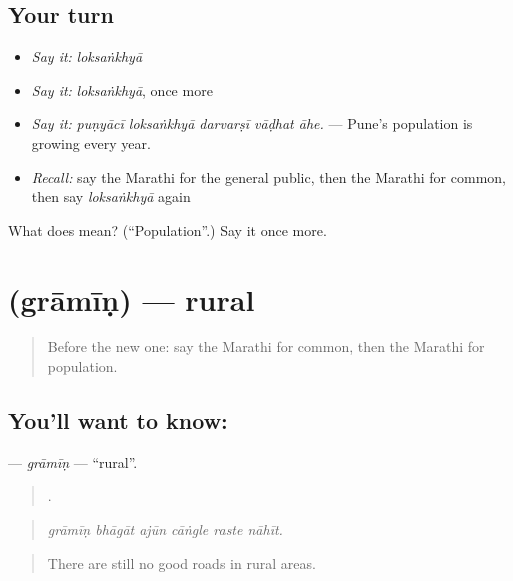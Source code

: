 \subsection*{Your turn}
\begin{itemize}
\raggedright
  \item \emph{Say it:} \emph{loksaṅkhyā}
  \item \emph{Say it:} \emph{loksaṅkhyā}, once more
  \item \emph{Say it:} \emph{puṇyācī loksaṅkhyā darvarṣī vāḍhat āhe.} — Pune's population is growing every year.
  \item \emph{Recall:} say the Marathi for the general public, then the Marathi for common, then say \emph{loksaṅkhyā} again
\end{itemize}

\begin{tcolorbox}[breakable,colback=teal!4,colframe=teal!35!black,title={Before you move on}]
What does  mean? (\textquotedblleft{}Population\textquotedblright{}.) Say it once more.
\end{tcolorbox}
\section[\texorpdfstring{\mr{ग्रामीण} (grāmīṇ)}{ग्रामीण (grāmīṇ)}]{ (grāmīṇ) — rural}

\label{lesson:MR-C354-gramin}



\begin{quote}
Before the new one: say the Marathi for common, then the Marathi for population.
\end{quote}

\subsection*{You'll want to know: }
\textbf{} — \emph{grāmīṇ} — \textquotedblleft{}rural\textquotedblright{}.

\begin{quote}
     .
\end{quote}

\begin{quote}
\emph{grāmīṇ bhāgāt ajūn cāṅgle raste nāhīt.}
\end{quote}

\begin{quote}
There are still no good roads in rural areas.
\end{quote}

